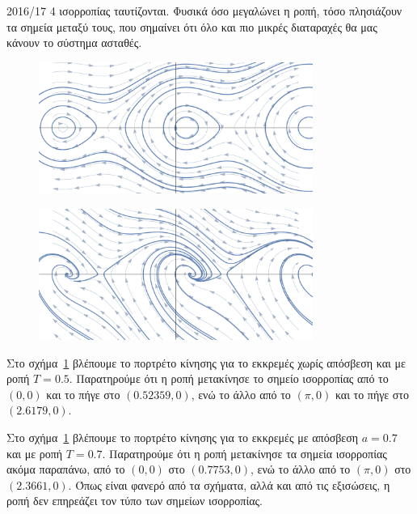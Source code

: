 \begin{solution}{2016/17 4}
    ισορροπίας ταυτίζονται. Φυσικά όσο μεγαλώνει η ροπή, τόσο πλησιάζουν τα
    σημεία μεταξύ τους, που σημαίνει ότι όλο και πιο μικρές διαταραχές θα μας
    κάνουν το σύστημα ασταθές.
    \begin{figure}[h]
        \centering
        \includegraphics[width=0.8\textwidth]{figures/ex4_torque05Comb.pdf}
        \caption{}
        \label{fig:ex4_torque05Comb}
    \end{figure}
    \begin{figure}[h]
        \centering
        \includegraphics[width=0.8\textwidth]{figures/ex4_torque07damped07Comb.pdf}
        \caption{}
        \label{fig:ex4_torque07damped07Comb}
    \end{figure}

    Στο σχήμα~\ref{fig:ex4_torque05Comb} βλέπουμε το πορτρέτο κίνησης για το
    εκκρεμές χωρίς απόσβεση και με ροπή \( T = 0.5 \). Παρατηρούμε ότι η ροπή
    μετακίνησε το σημείο ισορροπίας από το \( (0, 0) \) και το πήγε στο
    \( (0.52359, 0) \), ενώ το άλλο από το \( (\pi, 0) \) και το πήγε στο
    \( (2.6179, 0) \).

    Στο σχήμα~\ref{fig:ex4_torque05Comb} βλέπουμε το πορτρέτο κίνησης για το
    εκκρεμές με απόσβεση \( a = 0.7 \) και με ροπή \( T = 0.7 \). Παρατηρούμε
    ότι η ροπή μετακίνησε τα σημεία ισορροπίας ακόμα παραπάνω,
    από το \( (0, 0) \) στο \( (0.7753, 0) \), ενώ το άλλο από το \( (\pi, 0) \)
    στο \( (2.3661, 0) \). Όπως είναι φανερό από τα σχήματα, αλλά και από τις
    εξισώσεις, η ροπή δεν επηρεάζει τον τύπο των σημείων ισορροπίας.


\end{solution}
